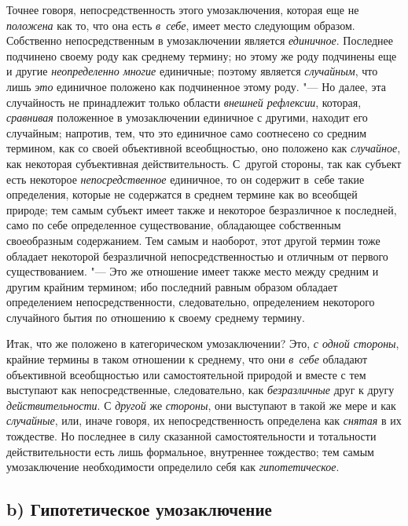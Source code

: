 Точнее говоря, непосредственность этого умозаключения, которая
еще не {\em положена} как
то, что она есть {\em в~себе},
имеет место следующим образом. Собственно непосредственным в
умозаключении является {\em единичное}.
Последнее подчинено своему роду как среднему термину; но
этому же роду подчинены еще и другие
{\em неопределенно многие}
единичные; поэтому является
{\em случайным}, что лишь
{\em это} единичное
положено как подчиненное этому роду. "--- Но далее, эта
случайность не принадлежит только области
{\em внешней рефлексии},
которая, {\em сравнивая}
положенное в умозаключении единичное с другими, находит его
случайным; напротив, тем, что это единичное само соотнесено со средним
термином, как со своей объективной всеобщностью, оно положено как
{\em случайное}, как
некоторая субъективная действительность. С~другой стороны, так как субъект
есть некоторое {\em непосредственное}
единичное, то он содержит в~себе такие определения, которые
не содержатся в среднем термине как во всеобщей природе; тем самым субъект
имеет также и некоторое безразличное к последней, само по себе определенное
существование, обладающее собственным своеобразным
содержанием. Тем самым и наоборот, этот другой
термин
тоже обладает некоторой безразличной непосредственностью и
отличным от первого существованием. "--- Это же отношение имеет
также место между средним и другим крайним термином; ибо последний равным
образом обладает определением непосредственности, следовательно,
определением некоторого случайного бытия по отношению к своему среднему
термину.

Итак, что же положено в категорическом умозаключении? Это,
{\em с одной стороны},
крайние термины в таком отношении к среднему, что они
{\em в~себе} обладают
объективной всеобщностью или самостоятельной природой и вместе с тем
выступают как непосредственные, следовательно, как
{\em безразличные} друг к
другу {\em действительности}.
С {\em другой}
же {\em стороны},
они выступают в такой же мере и как
{\em случайные}, или,
иначе говоря, их непосредственность определена как
{\em снятая} в их
тождестве. Но последнее в силу сказанной самостоятельности и тотальности
действительности есть лишь формальное, внутреннее тождество; тем самым
умозаключение необходимости определило себя как
{\em гипотетическое}.

\subsection[b) Гипотетическое умозаключение]{b) Гипотетическое умозаключение}

